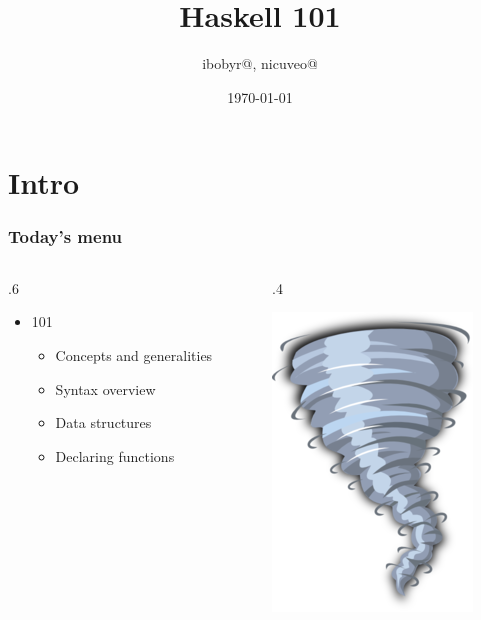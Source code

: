 \documentclass[17pt]{beamer}
\title{Haskell 101}
\author{ibobyr@, nicuveo@}
\date{\small\today}
\renewcommand{\(}[1]{\begin{columns}[#1]}
\renewcommand{\)}{\end{columns}}
\newcommand{\<}[1]{\begin{column}{#1}}
\renewcommand{\>}{\end{column}}
\begin{document}

\togglefalse{showpagenumber}
\begin{frame}[fragile]
  \titlepage
\end{frame}
\toggletrue{showpagenumber}
\setcounter{framenumber}{0}




\section{Intro}

\begin{frame}
  \frametitle{Today's menu}
  \({c}
  \<{.6\textwidth}
  \begin{center}
  \begin{itemize}
  \item 101
    \begin{itemize}
    \item Concepts and generalities
    \item Syntax overview
    \item Data structures
    \item Declaring functions
    \end{itemize}
  \end{itemize}
  \end{center}
  \>
  \<{.4\textwidth}
  \begin{center}
    \includegraphics[width=.5\textwidth]{img/whirlwind}
  \end{center}
  \>
  \)
\end{frame}
\end{document}
